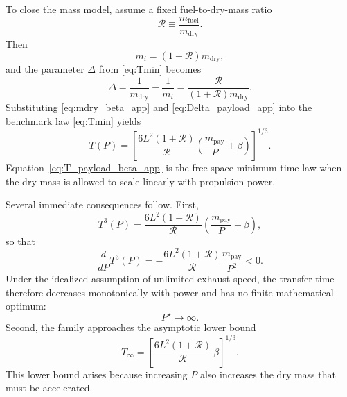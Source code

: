 \documentclass[journal, a4paper]{IEEEtran}
\begin{document}
To close the mass model, assume a fixed fuel-to-dry-mass ratio
\begin{equation}
  \mathcal{R}\equiv \frac{m_\mathrm{fuel}}{m_\mathrm{dry}}.
\end{equation}
Then
\begin{equation}
  m_i=(1+\mathcal{R})m_\mathrm{dry},
\end{equation}
and the parameter \(\Delta\) from \eqref{eq:Tmin} becomes
\begin{equation}
  \Delta
  = \frac{1}{m_\mathrm{dry}}-\frac{1}{m_i}
  = \frac{\mathcal{R}}{(1+\mathcal{R})m_\mathrm{dry}}.
  \label{eq:Delta_payload_app}
\end{equation}
Substituting \eqref{eq:mdry_beta_app} and \eqref{eq:Delta_payload_app} into the benchmark law \eqref{eq:Tmin} yields
\begin{equation}
  T(P)
  =
  \left[
    \frac{6L^2(1+\mathcal{R})}{\mathcal{R}}
    \left(
      \frac{m_\mathrm{pay}}{P}+\beta
    \right)
  \right]^{1/3}.
  \label{eq:T_payload_beta_app}
\end{equation}
Equation~\eqref{eq:T_payload_beta_app} is the free-space minimum-time law when the dry mass is allowed to scale linearly with propulsion power.

Several immediate consequences follow. 
First,
\begin{equation}
  T^3(P)
  =
  \frac{6L^2(1+\mathcal{R})}{\mathcal{R}}
  \left(
    \frac{m_\mathrm{pay}}{P}+\beta
  \right),
\end{equation}
so that
\begin{equation}
  \frac{d}{dP}T^3(P)
  =
  -\frac{6L^2(1+\mathcal{R})}{\mathcal{R}}
   \frac{m_\mathrm{pay}}{P^2}
  <0.
\end{equation}
Under the idealized assumption of unlimited exhaust speed, the transfer time therefore decreases monotonically with power and has no finite mathematical optimum:
\begin{equation}
  P^\star \to \infty.
\end{equation}
Second, the family approaches the asymptotic lower bound
\begin{equation}
  T_\infty
  =
  \left[
    \frac{6L^2(1+\mathcal{R})}{\mathcal{R}}\,\beta
  \right]^{1/3}.
  \label{eq:T_infty_beta_app}
\end{equation}
This lower bound arises because increasing \(P\) also increases the dry mass that must be accelerated.
\end{document}
